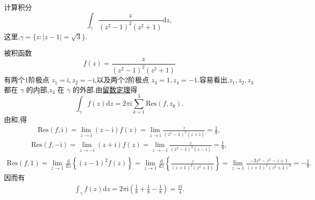 \documentclass[../../main.tex]{subfiles}%
\begin{document}
\begin{example}
计算积分
\[
\int_{\gamma} \frac{z}{(z^2 - 1)^2 (z^2 + 1)} \mathrm{d}z,
\]
这里,\( \gamma = \{ z: |z - 1| = \sqrt{3} \} \).
\end{example}
\begin{solution}

被积函数
\[
f(z) = \frac{z}{(z^2 - 1)^2 (z^2 + 1)}
\]
有两个1阶极点 \( z_1 = \mathrm{i}, z_2 = -\mathrm{i} \),以及两个2阶极点 \( z_3 = 1, z_4 = -1 \).容易看出,\( z_1, z_2, z_3 \) 都在 \( \gamma \) 的内部,\( z_4 \) 在 \( \gamma \) 的外部.由\hyperref[theorem:留数定理(残数定理)-定理5.4.9]{留数定理}得
\[
\int_{\gamma} f(z) \mathrm{d}z = 2\pi \mathrm{i} \sum_{k = 1}^{3} \mathrm{Res}(f, z_k).
\]
由和,得
\begin{align*}
\mathrm{Res}(f, \mathrm{i}) = \lim_{z \to \mathrm{i}} (z - \mathrm{i}) f(z) = \lim_{z \to \mathrm{i}} \frac{z}{(z^2 - 1)^2 (z + \mathrm{i})} = \frac{1}{8},
\end{align*}
\begin{align*}
\mathrm{Res}(f, -\mathrm{i}) = \lim_{z \to -\mathrm{i}} (z + \mathrm{i}) f(z) = \lim_{z \to -\mathrm{i}} \frac{z}{(z^2 - 1)^2 (z - \mathrm{i})} = \frac{1}{8},
\end{align*}
\begin{align*}
\mathrm{Res}(f, 1) = \lim_{z \to 1} \frac{\mathrm{d}}{\mathrm{d}z} \left\{ (z - 1)^2 f(z) \right\} = \lim_{z \to 1} \frac{\mathrm{d}}{\mathrm{d}z} \left\{ \frac{z}{(z + 1)^2 (z^2 + 1)} \right\} = \lim_{z \to 1} \frac{-3z^3 - z^2 - z + 1}{(z + 1)^3 (z^2 + 1)^2} = -\frac{1}{8}.
\end{align*}
因而有
\begin{align*}
\int_{\gamma} f(z) \mathrm{d}z = 2\pi \mathrm{i} \left( \frac{1}{8} + \frac{1}{8} - \frac{1}{8} \right) = \frac{\pi \mathrm{i}}{4}.
\end{align*}

\end{solution}
\end{document}
